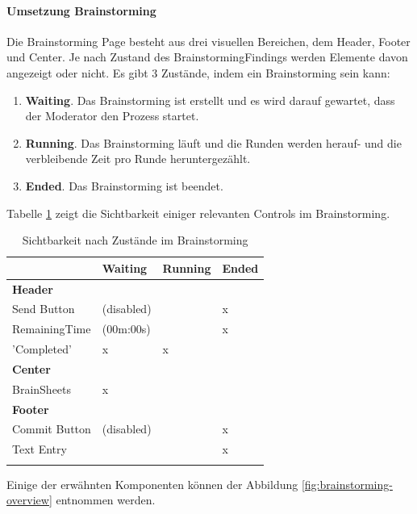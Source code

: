 \paragraph*{Umsetzung Brainstorming}
Die Brainstorming Page besteht aus drei visuellen Bereichen, dem Header, Footer und Center. Je nach Zustand des BrainstormingFindings werden Elemente davon angezeigt oder nicht. Es gibt 3 Zustände, indem ein Brainstorming sein kann:
\begin{enumerate}
	\item \textbf{Waiting}. Das Brainstorming ist erstellt und es wird darauf gewartet, dass der Moderator den Prozess startet.
	\item \textbf{Running}. Das Brainstorming läuft und die Runden werden herauf- und die verbleibende Zeit pro Runde heruntergezählt.
	\item \textbf{Ended}. Das Brainstorming ist beendet.
\end{enumerate}
Tabelle \ref{tab:visual-elements} zeigt die Sichtbarkeit einiger relevanten Controls im Brainstorming.

\renewcommand{\arraystretch}{1.5}
\begin{center}
	\begin{longtable}{| l | p{2cm} |p{2cm} |p{2cm} |}
		
		\hline
		&Waiting & Running & Ended\\
		\hline
		\textbf{Header}	& & & \\
		Send Button & \checkmark (disabled) & \checkmark & x\\
		RemainingTime & \checkmark (00m:00s) & \checkmark & x\\
		'Completed' & x & x & \checkmark\\
		\hline
		\textbf{Center}	& & & \\
		BrainSheets & x & \checkmark & \checkmark\\
		\hline
		\textbf{Footer}	& & & \\
		Commit Button & \checkmark (disabled) & \checkmark & x\\
		Text Entry & \checkmark & \checkmark & x\\
		\hline
		\caption{Sichtbarkeit nach Zustände im Brainstorming}

		\label{tab:visual-elements}
	\end{longtable}
\end{center}


Einige der erwähnten Komponenten können der Abbildung \ref{fig:brainstorming-overview} entnommen werden.



